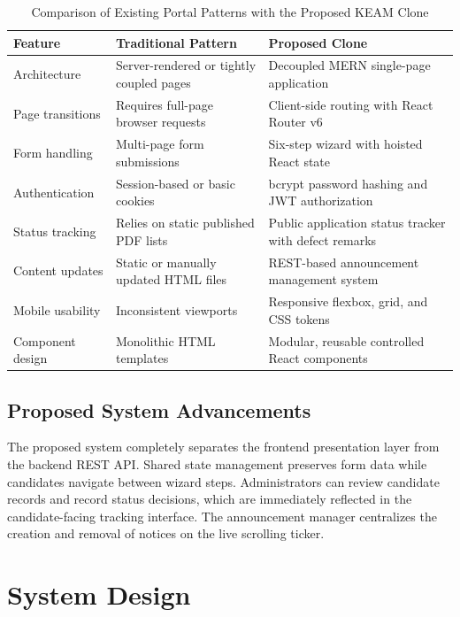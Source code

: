 \documentclass[12pt,a4paper,oneside]{report}
\begin{document}
\begin{table}[!htbp]
\centering
\caption{Comparison of Existing Portal Patterns with the Proposed KEAM Clone}
\label{tab:comparison}
\small
\begin{tabularx}{\textwidth}{L{3.0cm} Y Y}
\toprule
\textbf{Feature} & \textbf{Traditional Pattern} & \textbf{Proposed Clone} \\
\midrule
Architecture & Server-rendered or tightly coupled pages & Decoupled MERN single-page application \\
Page transitions & Requires full-page browser requests & Client-side routing with React Router v6 \\
Form handling & Multi-page form submissions & Six-step wizard with hoisted React state \\
Authentication & Session-based or basic cookies & bcrypt password hashing and JWT authorization \\
Status tracking & Relies on static published PDF lists & Public application status tracker with defect remarks \\
Content updates & Static or manually updated HTML files & REST-based announcement management system \\
Mobile usability & Inconsistent viewports & Responsive flexbox, grid, and CSS tokens \\
Component design & Monolithic HTML templates & Modular, reusable controlled React components \\
\bottomrule
\end{tabularx}
\end{table}

\section{Proposed System Advancements}
The proposed system completely separates the frontend presentation layer from the backend REST API. Shared state management preserves form data while candidates navigate between wizard steps. Administrators can review candidate records and record status decisions, which are immediately reflected in the candidate-facing tracking interface. The announcement manager centralizes the creation and removal of notices on the live scrolling ticker.

\chapter{System Design}
\end{document}
